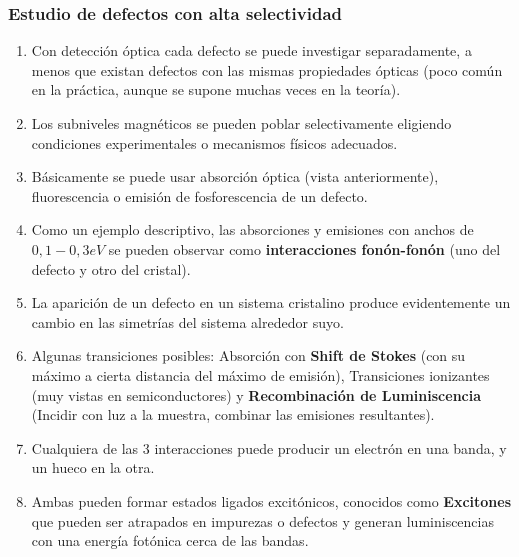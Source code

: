\documentclass[aps,rmp,reprint,longbibliography]{revtex4-1}
\begin{document}
\subsubsection{Estudio de defectos con alta selectividad}
\begin{enumerate}
\item Con detección óptica cada defecto se puede investigar separadamente, a menos que existan defectos con las mismas propiedades ópticas (poco común en la práctica, aunque se supone muchas veces en la teoría).
\item Los subniveles magnéticos se pueden poblar selectivamente eligiendo condiciones experimentales o mecanismos físicos adecuados. 
\item Básicamente se puede usar absorción óptica (vista anteriormente), fluorescencia o emisión de fosforescencia de un defecto.
\item Como un ejemplo descriptivo, las absorciones y emisiones con anchos de $0,1-0,3 eV$ se pueden observar como \textbf{interacciones fonón-fonón} (uno del defecto y otro del cristal).
\item La aparición de un defecto en un sistema cristalino produce evidentemente un cambio en las simetrías del sistema alrededor suyo.
\item Algunas transiciones posibles: Absorción con \textbf{Shift de Stokes} (con su máximo a cierta distancia del máximo de emisión), Transiciones ionizantes (muy vistas en semiconductores) y \textbf{Recombinación de Luminiscencia} (Incidir con luz a la muestra, combinar las emisiones resultantes).
\item Cualquiera de las 3 interacciones puede producir un electrón en una banda, y un hueco en la otra.
\item Ambas pueden formar  estados ligados excitónicos, conocidos como  \textbf{Excitones} que pueden ser atrapados en impurezas o defectos y generan luminiscencias con una energía fotónica cerca de las bandas. 
\end{enumerate}
\end{document}
